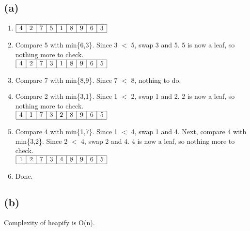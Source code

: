 \documentclass{article}[12pt]
\begin{document}
\subsection*{(a)}
\begin{enumerate}
  \item
    $\begin{array}{|c|c|c|c|c|c|c|c|c|} \hline 
      4 & 2 & 7 & 5 & 1 & 8 & 9 & 6 & 3 \\ \hline
    \end{array}$

  \item Compare 5 with min\{6,3\}. Since 3 $<$ 5, swap 3 and 5. 5 is now a leaf, so nothing more to check. \\
    $\begin{array}{|c|c|c|c|c|c|c|c|c|} \hline 
      4 & 2 & 7 & 3 & 1 & 8 & 9 & 6 & 5 \\ \hline
    \end{array}$
    
  \item Compare 7 with min\{8,9\}. Since 7 $<$ 8, nothing to do.
    
  \item Compare 2 with min\{3,1\}. Since 1 $<$ 2, swap 1 and 2. 2 is now a leaf, so nothing more to check. \\
    $\begin{array}{|c|c|c|c|c|c|c|c|c|} \hline 
      4 & 1 & 7 & 3 & 2 & 8 & 9 & 6 & 5 \\ \hline
    \end{array}$
    
  \item Compare 4 with min\{1,7\}. Since 1 $<$ 4, swap 1 and 4. Next, compare 4 with min\{3,2\}. Since 2 $<$ 4, swap 2 and 4. 4 is now a leaf, so nothing more to check. \\
    $\begin{array}{|c|c|c|c|c|c|c|c|c|} \hline 
      1 & 2 & 7 & 3 & 4 & 8 & 9 & 6 & 5 \\ \hline
    \end{array}$

  \item Done.
\end{enumerate}

\subsection*{(b)}
Complexity of heapify is O(n).
\end{document}
